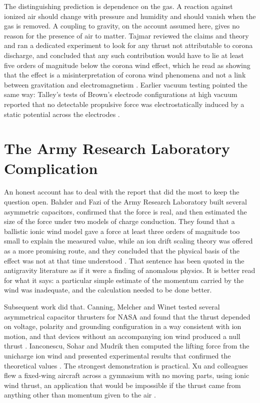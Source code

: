 \documentclass[11pt]{article}
\begin{document}
The distinguishing prediction is dependence on the gas. A reaction against ionized air should change with pressure and humidity and should vanish when the gas is removed. A coupling to gravity, on the account assumed here, gives no reason for the presence of air to matter. Tajmar reviewed the claims and theory and ran a dedicated experiment to look for any thrust not attributable to corona discharge, and concluded that any such contribution would have to lie at least five orders of magnitude below the corona wind effect, which he read as showing that the effect is a misinterpretation of corona wind phenomena and not a link between gravitation and electromagnetism \cite{T2004}. Earlier vacuum testing pointed the same way: Talley's tests of Brown's electrode configurations at high vacuum reported that no detectable propulsive force was electrostatically induced by a static potential across the electrodes \cite{Talley1991}.

\section{The Army Research Laboratory Complication}

An honest account has to deal with the report that did the most to keep the question open. Bahder and Fazi of the Army Research Laboratory built several asymmetric capacitors, confirmed that the force is real, and then estimated the size of the force under two models of charge conduction. They found that a ballistic ionic wind model gave a force at least three orders of magnitude too small to explain the measured value, while an ion drift scaling theory was offered as a more promising route, and they concluded that the physical basis of the effect was not at that time understood \cite{BF2003}. That sentence has been quoted in the antigravity literature as if it were a finding of anomalous physics. It is better read for what it says: a particular simple estimate of the momentum carried by the wind was inadequate, and the calculation needed to be done better.

Subsequent work did that. Canning, Melcher and Winet tested several asymmetrical capacitor thrusters for NASA and found that the thrust depended on voltage, polarity and grounding configuration in a way consistent with ion motion, and that devices without an accompanying ion wind produced a null thrust \cite{CMW2004}. Ianconescu, Sohar and Mudrik then computed the lifting force from the unicharge ion wind and presented experimental results that confirmed the theoretical values \cite{ISM2011}. The strongest demonstration is practical. Xu and colleagues flew a fixed-wing aircraft across a gymnasium with no moving parts, using ionic wind thrust, an application that would be impossible if the thrust came from anything other than momentum given to the air \cite{Xu2018}.
\end{document}
